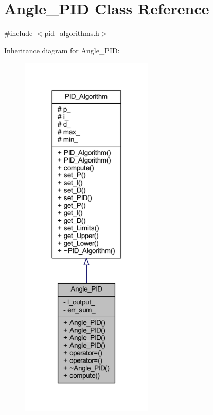 \hypertarget{class_angle___p_i_d}{}\section{Angle\+\_\+\+P\+ID Class Reference}
\label{class_angle___p_i_d}


{\ttfamily \#include $<$pid\+\_\+algorithms.\+h$>$}



Inheritance diagram for Angle\+\_\+\+P\+ID\+:
\nopagebreak
\begin{figure}[H]
\begin{center}
\leavevmode
\includegraphics[width=180pt]{class_angle___p_i_d__inherit__graph}
\end{center}
\end{figure}


